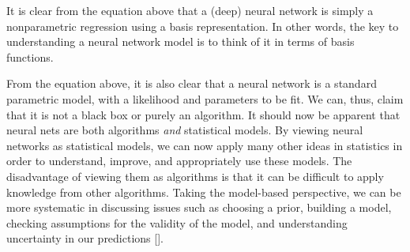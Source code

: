 It is clear from the equation above  that a (deep) neural network is simply a nonparametric regression using a basis representation. In other words, the key to understanding a neural network model is to think of it in terms of basis functions. 

From the equation above, it is also clear that a neural network is a standard parametric model, with a likelihood and parameters to be fit. We can, thus, claim that it is not a black box or purely an algorithm. It should now be apparent that neural nets are both algorithms \textit{and} statistical models. By viewing neural networks as statistical models, we can now apply many other ideas in statistics in order to understand, improve, and appropriately use these models. The disadvantage of viewing them as algorithms is that it can be difficult to apply knowledge from other algorithms. Taking the model-based perspective, we can be more systematic in discussing issues such as choosing a prior, building a model, checking assumptions for the validity of the model, and understanding uncertainty in our predictions [\cite{Lee2004, Polson2017}]. 

